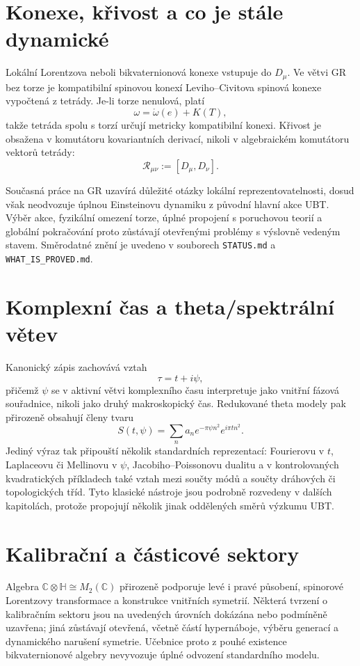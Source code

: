 \section{Konexe, křivost a co je stále dynamické}
Lokální Lorentzova neboli bikvaternionová konexe vstupuje do $D_\mu$. Ve větvi
GR bez torze je kompatibilní spinovou konexí Leviho--Civitova spinová konexe
vypočtená z tetrády. Je-li torze nenulová, platí
\[
 \omega=\mathring\omega(e)+K(T),
\]
takže tetráda spolu s torzí určují metricky kompatibilní konexi. Křivost je
obsažena v komutátoru kovariantních derivací, nikoli v algebraickém komutátoru
vektorů tetrády:
\[
 \mathcal R_{\mu\nu}:=[D_\mu,D_\nu].
\]

Současná práce na GR uzavírá důležité otázky lokální reprezentovatelnosti,
dosud však neodvozuje úplnou Einsteinovu dynamiku z původní hlavní akce UBT.
Výběr akce, fyzikální omezení torze, úplné propojení s poruchovou teorií a
globální pokračování proto zůstávají otevřenými problémy s výslovně vedeným
stavem. Směrodatné znění je uvedeno v souborech
\texttt{STATUS.md} a \texttt{WHAT\_IS\_PROVED.md}.

\section{Komplexní čas a theta/spektrální větev}
Kanonický zápis zachovává vztah
\[
 \tau=t+i\psi,
\]
přičemž $\psi$ se v aktivní větvi komplexního času interpretuje jako vnitřní
fázová souřadnice, nikoli jako druhý makroskopický čas. Redukované theta modely
pak přirozeně obsahují členy tvaru
\[
 S(t,\psi)=\sum_n a_n e^{-\pi\psi n^2}e^{i\pi t n^2}.
\]
Jediný výraz tak připouští několik standardních reprezentací: Fourierovu v
$t$, Laplaceovu či Mellinovu v $\psi$, Jacobiho--Poissonovu dualitu a v
kontrolovaných kvadratických příkladech také vztah mezi součty módů a součty
dráhových či topologických tříd. Tyto klasické nástroje jsou podrobně rozvedeny
v dalších kapitolách, protože propojují několik jinak oddělených směrů výzkumu
UBT.

\section{Kalibrační a částicové sektory}
Algebra $\mathbb C\otimes\mathbb H\cong M_2(\mathbb C)$ přirozeně podporuje
levé i pravé působení, spinorové Lorentzovy transformace a konstrukce vnitřních
symetrií. Některá tvrzení o kalibračním sektoru jsou na uvedených úrovních
dokázána nebo podmíněně uzavřena; jiná zůstávají otevřená, včetně částí
hypernáboje, výběru generací a dynamického narušení symetrie. Učebnice proto z
pouhé existence bikvaternionové algebry nevyvozuje úplné odvození standardního
modelu.

